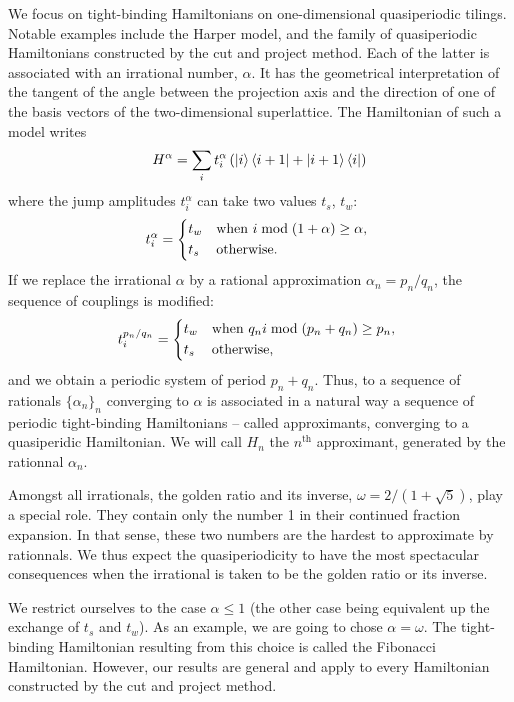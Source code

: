 \documentclass[aps,prl,preprint]{revtex4-1}
\begin{document}
We focus on tight-binding Hamiltonians on one-dimensional quasiperiodic tilings.
Notable examples include the Harper model, and the family of quasiperiodic Hamiltonians constructed by the cut and project method. 
Each of the latter is associated with an irrational number, $\alpha$.
It has the geometrical interpretation of the tangent of the angle between the projection axis and the direction of one of the basis vectors of the two-dimensional superlattice.
The Hamiltonian of such a model writes
\begin{equation}
	H^\alpha = \sum_i t^\alpha_i \left( \ket{i} \bra{i+1} + \ket{i+1} \bra{i} \right)
\end{equation}
where the jump amplitudes $t^\alpha_i$ can take two values $t_s$, $t_w$:
\begin{equation}
	t_i^\alpha = \begin{dcases*}
	t_w & when $i \bmod(1+\alpha) \geq \alpha$, \\
	t_s & otherwise.
	\end{dcases*}
\end{equation}
If we replace the irrational $\alpha$ by a rational approximation $\alpha_n = p_n/q_n$, the sequence of couplings is modified:
\begin{equation}
	t_i^{p_n/q_n} = \begin{dcases*}
	t_w & when $q_n i \bmod(p_n+q_n) \geq p_n$, \\
	t_s & otherwise,
	\end{dcases*}
\end{equation}
and we obtain a periodic system of period $p_n + q_n$. 
Thus, to a sequence of rationals $\{\alpha_n\}_n$ converging to $\alpha$ is associated in a natural way a sequence of periodic tight-binding Hamiltonians -- called approximants, converging to a quasiperidic Hamiltonian. We will call $H_n$ the $n^\text{th}$ approximant, generated by the rationnal $\alpha_n$.


Amongst all irrationals, the golden ratio and its inverse, $\omega = 2/(1+\sqrt{5})$, play a special role. They contain only the number 1 in their continued fraction expansion. In that sense, these two numbers are the hardest to approximate by rationnals. 
We thus expect the quasiperiodicity to have the most spectacular consequences when the irrational is taken to be the golden ratio or its inverse.

We restrict ourselves to the case $\alpha \leq 1$ (the other case being equivalent up the exchange of $t_s$ and $t_w$). As an example, we are going to chose $\alpha = \omega$. The tight-binding Hamiltonian resulting from this choice is called the Fibonacci Hamiltonian.
However, our results are general and apply to every Hamiltonian constructed by the cut and project method.
\end{document}
